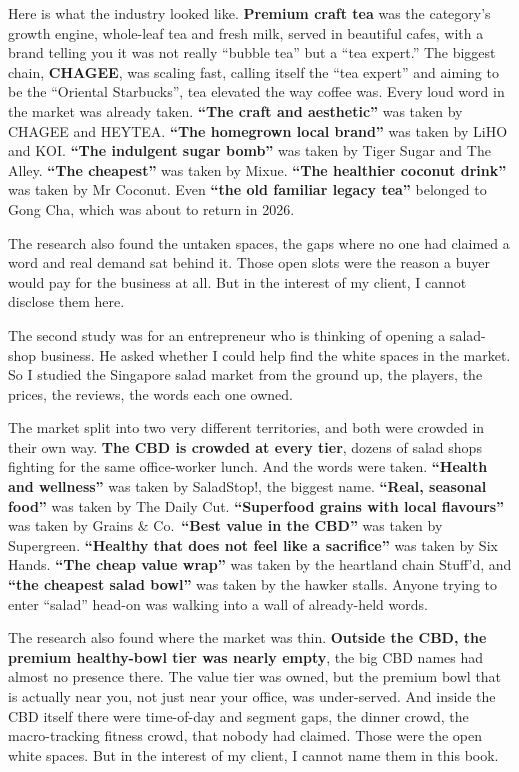 \documentclass[10pt,twoside,openany]{memoir}
\begin{document}
{Here is what the industry looked like. \textbf{Premium craft tea} was
the category's growth engine, whole-leaf tea and fresh milk, served in
beautiful cafes, with a brand telling you it was not really ``bubble
tea'' but a ``tea expert.'' The biggest chain, \textbf{CHAGEE}, was
scaling fast, calling itself the ``tea expert'' and aiming to be the
``Oriental Starbucks'', tea elevated the way coffee was. Every loud word
in the market was already taken. \textbf{``The craft and aesthetic''}
was taken by CHAGEE and HEYTEA. \textbf{``The homegrown local brand''}
was taken by LiHO and KOI. \textbf{``The indulgent sugar bomb''} was
taken by Tiger Sugar and The Alley. \textbf{``The cheapest''} was taken
by Mixue. \textbf{``The healthier coconut drink''} was taken by Mr
Coconut. Even \textbf{``the old familiar legacy tea''} belonged to Gong
Cha, which was about to return in 2026.

The research also found the untaken spaces, the gaps where no one had
claimed a word and real demand sat behind it. Those open slots were the
reason a buyer would pay for the business at all. But in the interest of
my client, I cannot disclose them here.

The second study was for an entrepreneur who is thinking of opening a
salad-shop business. He asked whether I could help find the white spaces
in the market. So I studied the Singapore salad market from the ground
up, the players, the prices, the reviews, the words each one owned.

The market split into two very different territories, and both were
crowded in their own way. \textbf{The CBD is crowded at every tier},
dozens of salad shops fighting for the same office-worker lunch. And the
words were taken. \textbf{``Health and wellness''} was taken by
SaladStop!, the biggest name. \textbf{``Real, seasonal food''} was taken
by The Daily Cut. \textbf{``Superfood grains with local flavours''} was
taken by Grains \& Co.~\textbf{``Best value in the CBD''} was taken by
Supergreen. \textbf{``Healthy that does not feel like a sacrifice''} was
taken by Six Hands. \textbf{``The cheap value wrap''} was taken by the
heartland chain Stuff'd, and \textbf{``the cheapest salad bowl''} was
taken by the hawker stalls. Anyone trying to enter ``salad'' head-on was
walking into a wall of already-held words.

The research also found where the market was thin. \textbf{Outside the
CBD, the premium healthy-bowl tier was nearly empty}, the big CBD names
had almost no presence there. The value tier was owned, but the premium
bowl that is actually near you, not just near your office, was
under-served. And inside the CBD itself there were time-of-day and
segment gaps, the dinner crowd, the macro-tracking fitness crowd, that
nobody had claimed. Those were the open white spaces. But in the
interest of my client, I cannot name them in this book.

}
\end{document}
